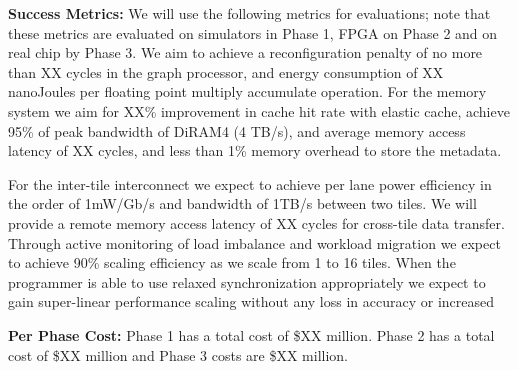 \textbf{Success Metrics:} 
We will use the following metrics for evaluations; note that these metrics are evaluated on simulators in Phase 1, FPGA on Phase 2 and on real chip by Phase 3.  We aim to achieve a reconfiguration penalty of no more than XX cycles in the graph processor, and energy consumption of XX nanoJoules per floating point multiply accumulate operation. For the memory system we aim for XX\% improvement in cache hit rate with elastic cache, achieve 95\% of peak bandwidth of DiRAM4 (4 TB/s), and average memory access latency of XX cycles, and less than 1\% memory overhead to store the metadata.

For the inter-tile interconnect we expect to achieve per lane power efficiency in the order of 1mW/Gb/s and bandwidth of 1TB/s between two tiles. We will provide a remote memory access latency of XX cycles for cross-tile data transfer. Through active monitoring of load imbalance and workload migration we expect to achieve 90\% scaling efficiency as we scale from 1 to 16 tiles. When the programmer is able to use relaxed synchronization appropriately we expect to gain super-linear performance scaling without any loss in accuracy or increased  


\textbf{Per Phase Cost:} 
Phase 1 has a total cost of \$XX million. Phase 2 has a total cost of \$XX million and Phase 3 costs are \$XX million.


